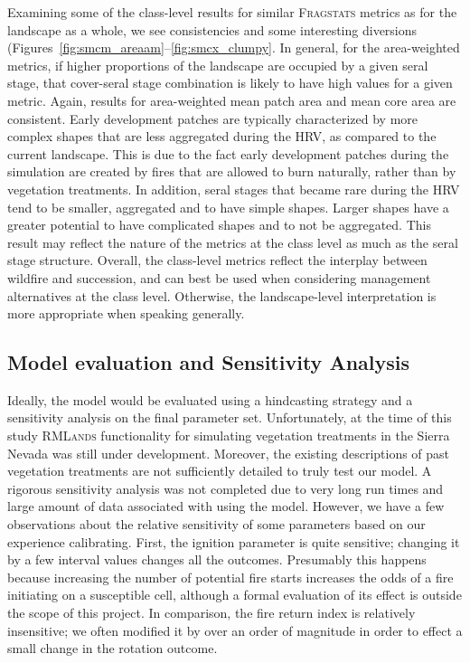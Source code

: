 Examining some of the class-level results for similar \textsc{Fragstats} metrics as for the landscape as a whole, we see consistencies and some interesting diversions (Figures~\ref{fig:smcm_areaam}--\ref{fig:smcx_clumpy}. In general, for the area-weighted metrics, if higher proportions of the landscape are occupied by a given seral stage, that cover-seral stage combination is likely to have high values for a given metric. Again, results for area-weighted mean patch area and mean core area are consistent. Early development patches are typically characterized by more complex shapes that are less aggregated during the HRV, as compared to the current landscape. This is due to the fact early development patches during the simulation are created by fires that are allowed to burn naturally, rather than by vegetation treatments. In addition, seral stages that became rare during the HRV tend to be smaller, aggregated and to have simple shapes. Larger shapes have a greater potential to have complicated shapes and to not be aggregated. This result may reflect the nature of the metrics at the class level as much as the seral stage structure. Overall, the class-level metrics reflect the interplay between wildfire and succession, and can best be used when considering management alternatives at the class level. Otherwise, the landscape-level interpretation is more appropriate when speaking generally. 


\subsection{Model evaluation and Sensitivity Analysis}
Ideally, the model would be evaluated using a hindcasting strategy and a sensitivity analysis on the final parameter set. Unfortunately, at the time of this study \textsc{RMLands} functionality for simulating vegetation treatments in the Sierra Nevada was still under development. Moreover, the existing descriptions of past vegetation treatments are not sufficiently detailed to truly test our model. A rigorous sensitivity analysis was not completed due to very long run times and large amount of data associated with using the model. However, we have a few observations about the relative sensitivity of some parameters based on our experience calibrating. First, the ignition parameter is quite sensitive; changing it by a few interval values changes all the outcomes. Presumably this happens because increasing the number of potential fire starts increases the odds of a fire initiating on a susceptible cell, although a formal evaluation of its effect is outside the scope of this project. In comparison, the fire return index is relatively insensitive; we often modified it by over an order of magnitude in order to effect a small change in the rotation outcome. 

